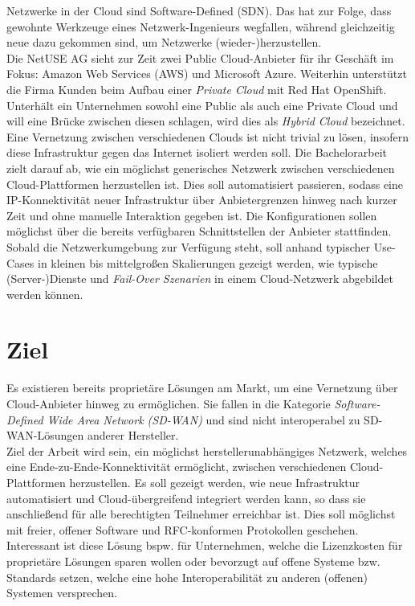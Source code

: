 Netzwerke in der Cloud sind Software-Defined (SDN)\cite{Seidel2015}. Das hat zur Folge, dass gewohnte Werkzeuge eines Netzwerk-Ingenieurs wegfallen, während gleichzeitig neue dazu gekommen sind, um Netzwerke (wieder-)herzustellen.\\
Die NetUSE AG sieht zur Zeit zwei Public Cloud-Anbieter für ihr Geschäft im Fokus: Amazon Web Services (AWS) und Microsoft Azure. Weiterhin unterstützt die Firma Kunden beim Aufbau einer \textit{Private Cloud} mit Red Hat OpenShift. Unterhält ein Unternehmen sowohl eine Public als auch eine Private Cloud und will eine Brücke zwischen diesen schlagen, wird dies als \textit{Hybrid Cloud} bezeichnet.\\
Eine Vernetzung zwischen verschiedenen Clouds ist nicht trivial zu lösen, insofern diese Infrastruktur gegen das Internet isoliert werden soll.
Die Bachelorarbeit zielt darauf ab, wie ein möglichst generisches Netzwerk zwischen verschiedenen Cloud-Plattformen herzustellen ist. Dies soll automatisiert passieren, sodass eine IP-Konnektivität neuer Infrastruktur über Anbietergrenzen hinweg nach kurzer Zeit und ohne manuelle Interaktion gegeben ist. Die Konfigurationen sollen möglichst über die bereits verfügbaren Schnittstellen der Anbieter stattfinden. Sobald die Netzwerkumgebung zur Verfügung steht, soll anhand typischer Use-Cases in kleinen bis mittelgroßen Skalierungen gezeigt werden, wie typische (Server-)Dienste und \textit{Fail-Over Szenarien}\cite{DBG2011} in einem Cloud-Netzwerk abgebildet werden können.

\section{Ziel}

Es existieren bereits proprietäre Lösungen am Markt, um eine Vernetzung über Cloud-Anbieter hinweg zu ermöglichen. Sie fallen in die Kategorie \textit{Software-Defined Wide Area Network (SD-WAN)} und sind nicht interoperabel zu SD-WAN-Lösungen anderer Hersteller.\\
Ziel der Arbeit wird sein, ein möglichst herstellerunabhängiges Netzwerk, welches eine Ende-zu-Ende-Konnektivität ermöglicht, zwischen verschiedenen Cloud-Plattformen herzustellen. Es soll gezeigt werden, wie neue Infrastruktur automatisiert und Cloud-übergreifend integriert werden kann, so dass sie anschließend für alle berechtigten Teilnehmer erreichbar ist. Dies soll möglichst mit freier, offener Software und RFC-konformen Protokollen geschehen.\\
Interessant ist diese Lösung bspw. für Unternehmen, welche die Lizenzkosten für proprietäre Lösungen sparen wollen oder bevorzugt auf offene Systeme bzw. Standards setzen, welche eine hohe Interoperabilität zu anderen (offenen) Systemen versprechen.

